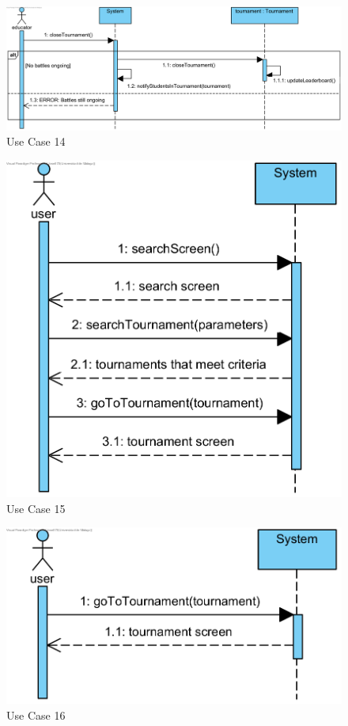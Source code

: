 \documentclass{article}
\begin{document}
\begin{figure}[H]
    \centering
    \includegraphics[width=1\textwidth]{images/UseCaseSequenceDiagrams/UC14}
    \caption{Use Case 14}
    \label{fig:UC14}
\end{figure}

\begin{figure}[H]
    \centering
    \includegraphics[width=1\textwidth]{images/UseCaseSequenceDiagrams/UC15}
    \caption{Use Case 15}
    \label{fig:UC15}
\end{figure}

\begin{figure}[H]
    \centering
    \includegraphics[width=1\textwidth]{images/UseCaseSequenceDiagrams/UC16}
    \caption{Use Case 16}
    \label{fig:UC16}
\end{figure}
\end{document}
